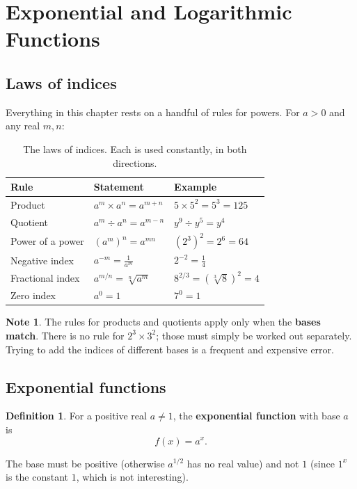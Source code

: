 \documentclass[11pt,a4paper]{article}
\theoremstyle{definition}
\newtheorem{definition}[thm]{Definition}
\newtheorem{note}[thm]{Note}
\begin{document}
\section{Exponential and Logarithmic Functions}

\subsection{Laws of indices}

Everything in this chapter rests on a handful of rules for powers. For $a>0$ and any
real $m,n$:

\begin{table}[H]
\centering
\begin{tabular}{|l|l|l|}
\hline
Rule & Statement & Example\\
\hline
Product & $a^m\times a^n=a^{m+n}$ & $5\times 5^2=5^3=125$\\
Quotient & $a^m\div a^n=a^{m-n}$ & $y^9\div y^5=y^4$\\
Power of a power & $\left(a^m\right)^n=a^{mn}$ & $\left(2^3\right)^2=2^6=64$\\
Negative index & $a^{-m}=\frac{1}{a^m}$ & $2^{-2}=\frac{1}{4}$\\
Fractional index & $a^{m/n}=\sqrt[n]{a^m}$ & $8^{2/3}=\left(\sqrt[3]{8}\right)^2=4$\\
Zero index & $a^0=1$ & $7^0=1$\\
\hline
\end{tabular}
\caption{The laws of indices. Each is used constantly, in both directions.}
\end{table}

\begin{note}
The rules for products and quotients apply only when the \textbf{bases match}. There is
no rule for $2^3\times 3^2$; those must simply be worked out separately. Trying to add
the indices of different bases is a frequent and expensive error.
\end{note}

\subsection{Exponential functions}

\begin{definition}
For a positive real $a\neq 1$, the \textbf{exponential function} with base $a$ is
$$f(x)=a^x.$$
\end{definition}

The base must be positive (otherwise $a^{1/2}$ has no real value) and not $1$ (since
$1^x$ is the constant $1$, which is not interesting).
\end{document}
